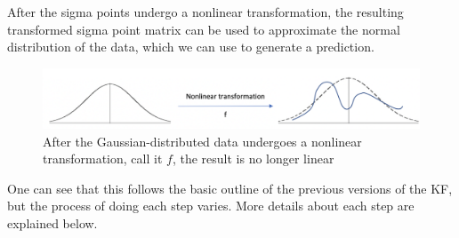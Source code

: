 \noindent After the sigma points undergo a nonlinear transformation, the resulting transformed sigma point matrix can be used to approximate the normal distribution of the data, which we can use to generate a prediction.
\begin{figure}[h]
    \centering
    \includegraphics[scale = 0.45]{transform.png}
    \caption{After the Gaussian-distributed data undergoes a nonlinear transformation, call it $f$, the result is no longer linear}
\end{figure}

\newpage
\noindent One can see that this follows the basic outline of the previous versions of the KF, but the process of doing each step varies. More details about each step are explained below.

